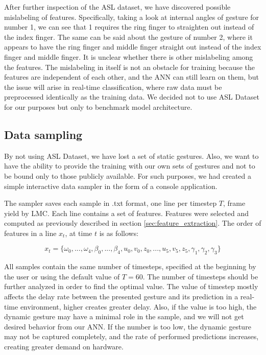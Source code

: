 After further inspection of the ASL dataset, we have discovered possible mislabeling of features. Specifically, taking a look at internal angles of gesture for number 1, we can see that 1 requires the ring finger to straighten out instead of the index finger. The same can be said about the gesture of number 2, where it appears to have the ring finger and middle finger straight out instead of the index finger and middle finger. It is unclear whether there is other mislabeling among the features. The mislabeling in itself is not an obstacle for training because the features are independent of each other, and the ANN can still learn on them, but the issue will arise in real-time classification, where raw data must be preprocessed identically as the training data. We decided not to use ASL Dataset for our purposes but only to benchmark model architecture.


\subsection{Data sampling}
\label{data_sampling}
By not using ASL Dataset, we have lost a set of static gestures. Also, we want to have the ability to provide the training with our own sets of gestures and not to be bound only to those publicly available. For such purposes, we had created a simple interactive data sampler in the form of a console application.

The sampler saves each sample in .txt format, one line per timestep $T$, frame yield by LMC. Each line contains a set of features. Features were selected and computed as previously described in section \ref{sec:feature_extraction}. The order of features in a line $x_t$, at time $t$ is as follows:


\begin{equation}
    {x_t = \{\omega_0, ...,\omega_4, \beta_0, ..., \beta_4, u_0,v_0,z_0, ..., u_5,v_5,z_5, \gamma_1, \gamma_2, \gamma_3\}}
\end{equation}

All samples contain the same number of timesteps, specified at the beginning by the user or using the default value of $T=60$. The number of timesteps should be further analyzed in order to find the optimal value. The value of timestep mostly affects the delay rate between the presented gesture and its prediction in a real-time environment, higher creates greater delay. Also, if the value is too high, the dynamic gesture may have a minimal role in the sample, and we will not get desired behavior from our ANN. If the number is too low, the dynamic gesture may not be captured completely, and the rate of performed predictions increases, creating greater demand on hardware. 


